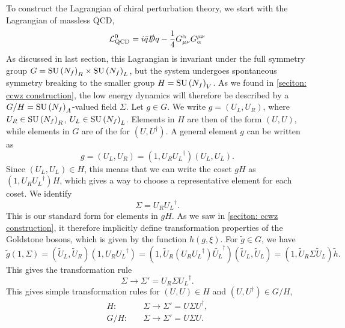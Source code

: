 To construct the Lagrangian of chiral perturbation theory, we start with the Lagrangian of massless QCD,
%
\begin{equation}
    \mathcal{L}^0_\text{QCD} = i \bar q \slashed D q - \frac{1}{4} G^\alpha_{\mu \nu} G_\alpha^{\mu \nu}
\end{equation}
%
As discussed in last section, this Lagrangian is invariant under the full symmetry group $G = \text{SU}\left(N_f\right)_R \times \text{SU}\left(N_f\right)_L$, but the system undergoes spontaneous symmetry breaking to the smaller group $H = \text{SU}\left(N_f\right)_V$.
As we found in \autoref{seciton: ccwz construction}, the low energy dynamics will therefore be described by a $G/H = \text{SU}\left(N_f\right)_A$-valued field $\Sigma$.
Let $g \in G$.
We write $g = (U_L, U_R)$, where $U_R \in \text{SU}\left(N_f\right)_R$, $U_L \in \text{SU}\left(N_f\right)_L$.
Elements in $H$ are then of the form $(U, U)$, while elements in $G$ are of the for $(U, U^\dagger)$.
A general element $g$ can be written as
%
\begin{equation}
    g = (U_L, U_R) = (1, U_R {U_L}^\dagger) (U_L, U_L).
\end{equation}
%
Since $(U_L, U_L) \in H$, this means that we can write the coset $g H$ as $(1, U_R {U_L}^\dagger)H$, which gives a way to choose a representative element for each coset.
We identify
%
\begin{equation}
    \Sigma = U_R {U_L}^\dagger. 
\end{equation}
%
This is our standard form for elements in $gH$.
As we saw in \autoref{seciton: ccwz construction}, it therefore implicitly define transformation properties of the Goldstone bosons, which is given by the function $h(g, \xi)$.
For $\tilde g \in G$, we have
%
\begin{equation}
    \tilde g (1, \Sigma)
    = (\tilde U_L, \tilde U_R) (1, U_R {U_L}^\dagger)
    = (1, \tilde U_R (U_R {U_L}^\dagger) \tilde {U_L}^\dagger) (\tilde U_L, \tilde U_L)
    = (1, \tilde U_R \Sigma \tilde U_L) \tilde h.
\end{equation}
%
This gives the transformation rule
\begin{equation}
    \Sigma \rightarrow \Sigma' = U_R \Sigma {U_L}^\dagger.
\end{equation}
%
This gives simple transformation rules for $(U, U) \in H$ and $(U, U^\dagger) \in G/H$,
\begin{align}
    \label{sigma transform under H}
    H:& \quad \Sigma \rightarrow \Sigma' = U \Sigma U^\dagger, \\
    \label{sigma transform under G/H}
    G/H:& \quad \Sigma \rightarrow \Sigma' = U \Sigma U.
\end{align}
